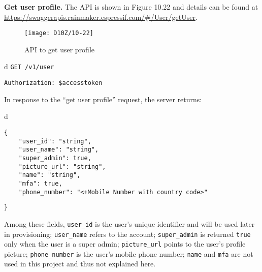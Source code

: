 \documentclass[a4paper,12pt]{book}
\begin{document}

\vspace{6pt}
\textbf{Get user profile.} The API is shown in Figure 10.22 and details can be found at \url{https://swaggerapis.rainmaker.espressif.com/\#/User/getUser}.

\begin{figure}[ht]
    \centering
    \texttt{[image: D10Z/10-22]}
    \caption{API to get user profile}
\end{figure}

\begin{codebloc}
\begin{tabular}{d}
\verb|GET /v1/user|

\verb|Authorization: $accesstoken|
\end{tabular}
\end{codebloc}

In response to the “get user profile” request, the server returns:

\begin{codebloc}
\begin{tabular}{d}
\vspace{2pt}
\begin{verbatim}
{
    "user_id": "string",
    "user_name": "string",
    "super_admin": true,
    "picture_url": "string",
    "name": "string",
    "mfa": true,
    "phone_number": "<+Mobile Number with country code>"
\end{verbatim}
\verb|}|
\end{tabular}
\end{codebloc}

Among these fields, \verb|user_id| is the user’s unique identifier and will be used later in provisioning; \verb|user_name| refers to the account; \verb|super_admin| is returned \verb|true| only when the user is a super admin; \verb|picture_url| points to the user’s profile picture; \verb|phone_number| is the user’s mobile phone number; \verb|name| and \verb|mfa| are not used in this project and thus not explained here.
\end{document}
